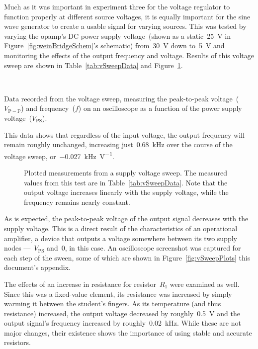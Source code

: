 Much as it was important in experiment three for the voltage regulator to
function properly at different source voltages, it is equally important for the
sine wave generator to create a usable signal for varying sources.  This was
tested by varying the opamp's DC power supply voltage~(shown as a
static~\SI{25}{\volt} in Figure~\ref{fig:weinBridgeSchem}'s schematic)
from~\SI{30}{\volt} down to~\SI{5}{\volt} and monitoring the effects of the
output frequency and voltage.  Results of this voltage sweep are shown in
Table~\ref{tab:vSweepData} and Figure~\ref{fig:vSweepPlot}.
%
\begin{table}[H]
	\centering
	\\
	\parbox{.6\textwidth}{
	\caption[Voltage Sweep Data]{Data recorded from the voltage sweep,
		measuring the peak-to-peak voltage~($V_\mathrm{P-P}$) and
		frequency~($f$) on an oscilloscope as a function of the power supply
		voltage~($V_\mathrm{PS}$).}
	\label{tab:vSweepData}}
\end{table}
%
This data shows that regardless of the input voltage, the output frequency will
remain roughly unchanged, increasing just~\SI{0.68}{\kilo\hertz} over the
course of the voltage sweep, or~\SI{-0.027}{\kilo\hertz\per\volt}.
%
\begin{figure}[H]
	\centering
	
	\parbox{4.25in}{
	\caption[Voltage Sweep Plot]{Plotted measurements from a supply voltage
	sweep.  The measured values from this test are in
	Table~\ref{tab:vSweepData}.  Note that the output voltage increases
	linearly with the supply voltage, while the frequency remains nearly
	constant.}
	\label{fig:vSweepPlot}}
\end{figure}
%
As is expected, the peak-to-peak voltage of the output signal decreases with
the supply voltage.  This is a direct result of the characteristics of an
operational amplifier, a device that outputs a voltage somewhere between its
two supply nodes ---~$V_\text{PS}$ and~0, in this case.  An oscilloscope
screenshot was captured for each step of the sween, some of which are shown in
Figure~\ref{fig:vSweepPlots} this document's appendix.

The effects of an increase in resistance for resistor~$R_1$ were examined as
well.  Since this was a fixed-value element, its resistance was increased by
simply warming it between the student's fingers.  As its temperature (and thus
resistance) increased, the output voltage decreased by roughly~\SI{0.5}{\volt}
and the output signal's frequency increased by roughly~\SI{0.02}{\kilo\hertz}.
While these are not major changes, their existence shows the importance of
using stable and accurate resistors.

